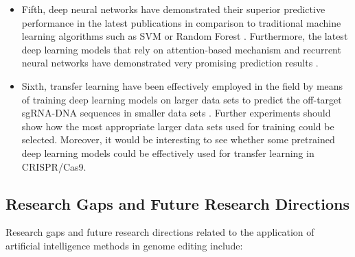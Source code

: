 \documentclass[unnumsec,webpdf,contemporary,large]{oup-authoring-template}
\theoremstyle{thmstyleone}%
\theoremstyle{thmstyletwo}%
\theoremstyle{thmstylethree}%
\begin{document}
\begin{itemize}
\item Fifth, deep neural networks have demonstrated their superior predictive performance in the latest  publications in comparison to traditional machine learning algorithms such as SVM or Random Forest \citep{lin2018off, charlier2021accurate}. Furthermore, the latest deep learning models that rely on attention-based mechanism and recurrent neural networks have demonstrated very promising prediction results \cite{liu2019prediction, xiao2021attcrispr}.

\item Sixth, transfer learning have been effectively employed in the field by means of training deep learning models on larger data sets to predict the off-target sgRNA-DNA sequences in smaller data sets \cite{lin2018off, charlier2021accurate}. Further experiments should show how the most appropriate larger data sets used for training could be selected. Moreover, it would be interesting to see whether some pretrained deep learning models could be effectively used for transfer learning in CRISPR/Cas9. \end{itemize}


\subsection{\textbf{Research Gaps and Future Research Directions}}
Research gaps and future research directions related to the application of artificial intelligence methods in genome editing include:
\end{document}
